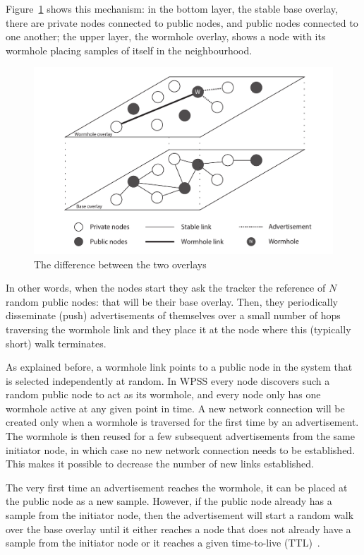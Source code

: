 Figure~\ref{fig:overlay} shows this mechanism: in the bottom layer, the stable base overlay, there are private nodes connected to public nodes, and public nodes connected to one another; the upper layer, the wormhole overlay, shows a node with its wormhole placing samples of itself in the neighbourhood.

\begin{figure}[ht]
  \centering
  \includegraphics[keepaspectratio=true, width=\textwidth]{images/overlay.pdf}\caption{The difference between the two overlays}
  \label{fig:overlay}
\end{figure}

In other words, when the nodes start they ask the tracker the reference of $N$ random public nodes: that will be their base overlay. Then, they periodically disseminate (push) advertisements of themselves over a small number of hops traversing the wormhole link and they place it at the node where this (typically short) walk terminates.

As explained before, a wormhole link points to a public node in the system that is selected independently at random. In \ac{WPSS} every node discovers such a random public node to act as its wormhole, and every node only has one wormhole active at any given point in time. A new network connection will be created only when a wormhole is traversed for the first time by an advertisement. The wormhole is then reused for a few subsequent advertisements from the same initiator node, in which case no new network connection needs to be established. This makes it possible to decrease the number of new links established.

The very first time an advertisement reaches the wormhole, it can be placed at the public node as a new sample. However, if the public node already has a sample from the initiator node, then the advertisement will start a random walk over the base overlay until it either reaches a node that does not already have a sample from the initiator node or it reaches a given time-to-live (TTL)~\cite{wormhole}.

